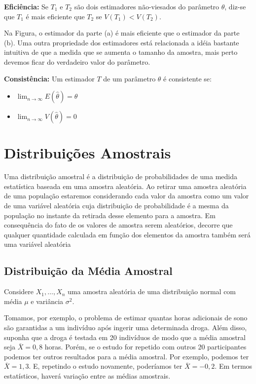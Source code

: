 \documentclass[
]{book}
\providecommand{\tightlist}{%
  \setlength{\itemsep}{0pt}\setlength{\parskip}{0pt}}
\begin{document}
\textbf{Eficiência:} Se \(T_1\) e \(T_2\) são dois estimadores não-viesados do parâmetro \(\theta\), diz-se que \(T_1\) é mais eficiente que \(T_2\) se \(V(T_1)<V(T_2)\).

Na Figura, o estimador da parte (a) é mais eficiente que o estimador da parte (b). Uma outra propriedade dos estimadores está relacionada a idéia bastante intuitiva de que a medida que se aumenta o tamanho da amostra, mais perto devemos ficar do verdadeiro valor do parâmetro.

\textbf{Consistência:} Um estimador \(T\) de um parâmetro \(\theta\) é consistente se:

\begin{itemize}
\tightlist
\item
  \(\lim_{n\to\infty} E(\hat\theta)=\theta\)
\item
  \(\lim_{n\to\infty} V(\hat\theta)=0\)
\end{itemize}

\hypertarget{distribuiuxe7uxf5es-amostrais-1}{%
\chapter{Distribuições Amostrais}\label{distribuiuxe7uxf5es-amostrais-1}}

Uma distribuição amostral é a distribuição de probabilidades de uma medida estatística baseada em uma amostra aleatória. Ao retirar uma amostra aleatória de uma população estaremos considerando cada valor da amostra como um valor de uma variável aleatória cuja distribuição de probabilidade é a mesma da população no instante da retirada desse elemento para a amostra. Em consequência do fato de os valores de amostra serem aleatórios, decorre que qualquer quantidade calculada em função dos elementos da amostra também será uma variável aleatória

\hypertarget{distribuiuxe7uxe3o-da-muxe9dia-amostral}{%
\section{Distribuição da Média Amostral}\label{distribuiuxe7uxe3o-da-muxe9dia-amostral}}

Considere \(X_1,\ldots,X_n\) uma amostra aleatória de uma distribuição normal com média \(\mu\) e variância \(\sigma^2\).

Tomamos, por exemplo, o problema de estimar quantas horas adicionais de sono são garantidas a um indivíduo após ingerir uma determinada droga. Além disso, suponha que a droga é testada em 20 indivíduos de modo que a média amostral seja \(\bar X=0,8\) horas. Porém, se o estudo for repetido com outros 20 participantes podemos ter outros resultados para a média amostral. Por exemplo, podemos ter \(\bar X=1,3\). E, repetindo o estudo novamente, poderíamos ter \(\bar X=-0,2\). Em termos estatísticos, haverá variação entre as médias amostrais.
\end{document}

